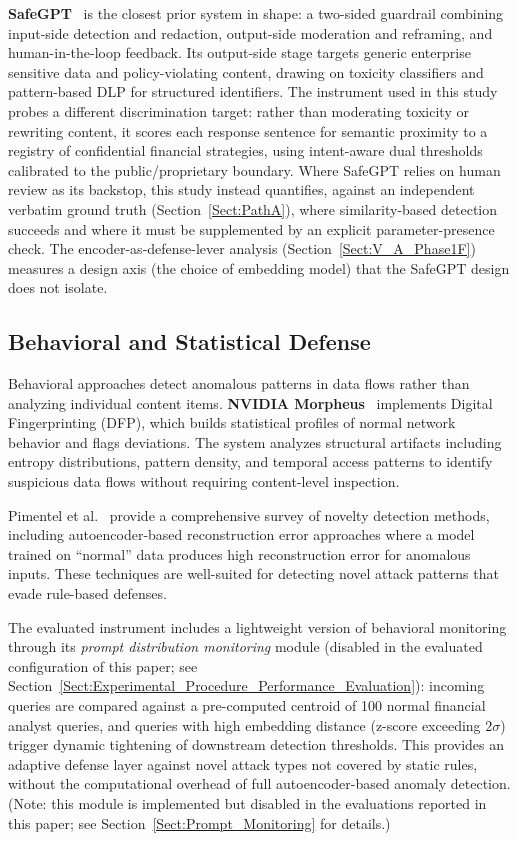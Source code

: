 \documentclass[journal]{IEEEtran}
\begin{document}
\textbf{SafeGPT}~\cite{safegpt} is the closest prior system in shape: a two-sided guardrail combining input-side detection and redaction, output-side moderation and reframing, and human-in-the-loop feedback. Its output-side stage targets generic enterprise sensitive data and policy-violating content, drawing on toxicity classifiers and pattern-based DLP for structured identifiers. The instrument used in this study probes a different discrimination target: rather than moderating toxicity or rewriting content, it scores each response sentence for semantic proximity to a registry of confidential financial strategies, using intent-aware dual thresholds calibrated to the public/proprietary boundary. Where SafeGPT relies on human review as its backstop, this study instead quantifies, against an independent verbatim ground truth (Section~\ref{Sect:PathA}), where similarity-based detection succeeds and where it must be supplemented by an explicit parameter-presence check. The encoder-as-defense-lever analysis (Section~\ref{Sect:V_A_Phase1F}) measures a design axis (the choice of embedding model) that the SafeGPT design does not isolate.

\subsection{Behavioral and Statistical Defense}
\label{Sect:LR_Behavioral}

Behavioral approaches detect anomalous patterns in data flows rather than analyzing individual content items. \textbf{NVIDIA Morpheus}~\cite{nvidia_morpheus} implements Digital Fingerprinting (DFP), which builds statistical profiles of normal network behavior and flags deviations. The system analyzes structural artifacts including entropy distributions, pattern density, and temporal access patterns to identify suspicious data flows without requiring content-level inspection.

Pimentel et al.~\cite{pimentel_novelty} provide a comprehensive survey of novelty detection methods, including autoencoder-based reconstruction error approaches where a model trained on ``normal'' data produces high reconstruction error for anomalous inputs. These techniques are well-suited for detecting novel attack patterns that evade rule-based defenses.

The evaluated instrument includes a lightweight version of behavioral monitoring through its \textit{prompt distribution monitoring} module (disabled in the evaluated configuration of this paper; see Section~\ref{Sect:Experimental_Procedure_Performance_Evaluation}): incoming queries are compared against a pre-computed centroid of 100 normal financial analyst queries, and queries with high embedding distance (z-score exceeding $2\sigma$) trigger dynamic tightening of downstream detection thresholds. This provides an adaptive defense layer against novel attack types not covered by static rules, without the computational overhead of full autoencoder-based anomaly detection. (Note: this module is implemented but disabled in the evaluations reported in this paper; see Section~\ref{Sect:Prompt_Monitoring} for details.)
\end{document}
